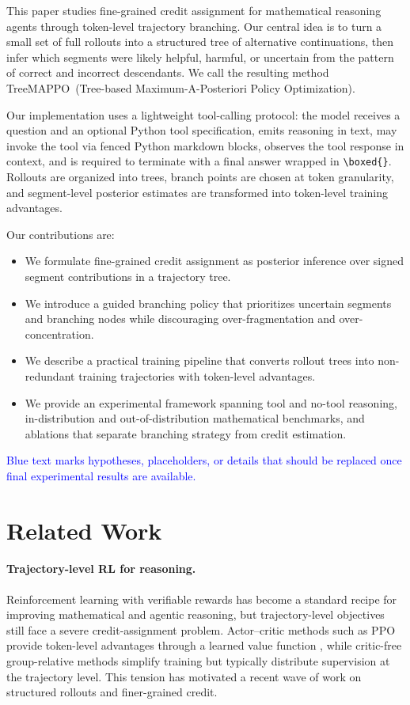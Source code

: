 \documentclass[letterpaper]{article} %
\newcommand{\ours}{TreeMAPPO}
\newcommand{\draftnote}[1]{\textcolor{blue}{#1}}
\begin{document}
This paper studies fine-grained credit assignment for mathematical reasoning agents through token-level trajectory branching. Our central idea is to turn a small set of full rollouts into a structured tree of alternative continuations, then infer which segments were likely helpful, harmful, or uncertain from the pattern of correct and incorrect descendants. We call the resulting method \ours\ (Tree-based Maximum-A-Posteriori Policy Optimization).

Our implementation uses a lightweight tool-calling protocol: the model receives a question and an optional Python tool specification, emits reasoning in text, may invoke the tool via fenced Python markdown blocks, observes the tool response in context, and is required to terminate with a final answer wrapped in \texttt{\textbackslash boxed\{\}}. Rollouts are organized into trees, branch points are chosen at token granularity, and segment-level posterior estimates are transformed into token-level training advantages.

Our contributions are:
\begin{itemize}
    \item We formulate fine-grained credit assignment as posterior inference over signed segment contributions in a trajectory tree.
    \item We introduce a guided branching policy that prioritizes uncertain segments and branching nodes while discouraging over-fragmentation and over-concentration.
    \item We describe a practical training pipeline that converts rollout trees into non-redundant training trajectories with token-level advantages.
    \item We provide an experimental framework spanning tool and no-tool reasoning, in-distribution and out-of-distribution mathematical benchmarks, and ablations that separate branching strategy from credit estimation.
\end{itemize}

\draftnote{Blue text marks hypotheses, placeholders, or details that should be replaced once final experimental results are available.}

\section{Related Work}
\paragraph{Trajectory-level RL for reasoning.}
Reinforcement learning with verifiable rewards has become a standard recipe for improving mathematical and agentic reasoning, but trajectory-level objectives still face a severe credit-assignment problem. Actor--critic methods such as PPO provide token-level advantages through a learned value function \cite{ppo17}, while critic-free group-relative methods simplify training but typically distribute supervision at the trajectory level. This tension has motivated a recent wave of work on structured rollouts and finer-grained credit.
\end{document}
